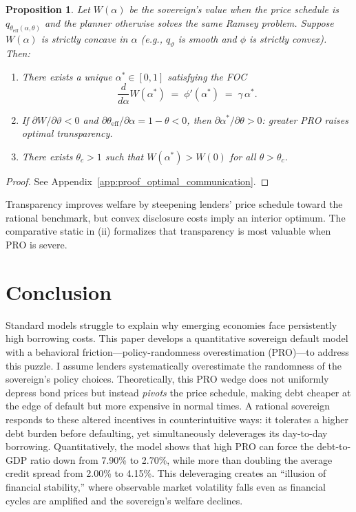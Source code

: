 \documentclass[12pt]{article}
\theoremstyle{plain}
\newtheorem{proposition}{Proposition}
\begin{document}
\begin{proposition}\label{prop:optimal_communication}
	Let $W(\alpha)$ be the sovereign's value when the price schedule is $q_{\theta_{\mathrm{eff}}(\alpha,\theta)}$ and the planner otherwise solves the same Ramsey problem. Suppose $W(\alpha)$ is strictly concave in $\alpha$ (e.g., $q_\vartheta$ is smooth and $\phi$ is strictly convex). Then:
	\begin{enumerate}
		\item[\textbf{(i)}] There exists a unique $\alpha^*\in[0,1]$ satisfying the FOC
		      \begin{equation}
			      \frac{d}{d\alpha}W(\alpha^*) \;=\; \phi'(\alpha^*) \;=\; \gamma\,\alpha^*.
			      \label{eq:foc_transparency}
		      \end{equation}
		\item[\textbf{(ii)}] If $\partial W/\partial \vartheta<0$ and $\partial \theta_{\mathrm{eff}}/\partial \alpha=1-\theta<0$, then $\partial \alpha^*/\partial \theta>0$: greater PRO raises optimal transparency.
		\item[\textbf{(iii)}] There exists $\theta_c>1$ such that $W(\alpha^*)>W(0)$ for all $\theta>\theta_c$.
	\end{enumerate}
\end{proposition}

\begin{proof}
	See Appendix~\ref{app:proof_optimal_communication}.
\end{proof}

Transparency improves welfare by steepening lenders' price schedule toward the
rational benchmark, but convex disclosure costs imply an interior optimum. The
comparative static in (ii) formalizes that transparency is most valuable when
PRO is severe.

\section{Conclusion}

Standard models struggle to explain why emerging economies face persistently
high borrowing costs. This paper develops a quantitative sovereign default
model with a behavioral friction---policy-randomness overestimation (PRO)---to
address this puzzle. I assume lenders systematically overestimate the
randomness of the sovereign's policy choices. Theoretically, this PRO wedge
does not uniformly depress bond prices but instead \textit{pivots} the price
schedule, making debt cheaper at the edge of default but more expensive in
normal times. A rational sovereign responds to these altered incentives in
counterintuitive ways: it tolerates a higher debt burden before defaulting, yet
simultaneously deleverages its day-to-day borrowing. Quantitatively, the model
shows that high PRO can force the debt-to-GDP ratio down from 7.90\% to 2.70\%,
while more than doubling the average credit spread from 2.00\% to 4.15\%. This
deleveraging creates an ``illusion of financial stability,'' where observable
market volatility falls even as financial cycles are amplified and the
sovereign's welfare declines.
\end{document}
